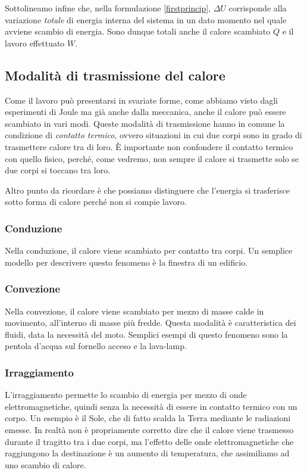 Sottolineamo infine che, nella formulazione \ref{firstprincip},
$\Delta U$ corrisponde alla variazione \textit{totale} di energia
interna del sistema in un dato momento nel quale avviene scambio
di energia. Sono dunque totali anche il calore scambiato
$Q$ e il lavoro effettuato $W$.


\subsection{Modalità di trasmissione del calore}
Come il lavoro può presentarsi in svariate forme, come abbiamo
visto dagli esperimenti di Joule ma già anche dalla meccanica,
anche il calore può essere scambiato in vari modi. Queste modalità
di trasmissione hanno in comune la condizione di \textit{contatto
termico}, ovvero situazioni in cui due corpi sono in grado di
trasmettere calore tra di loro. È importante non confondere il
contatto termico con quello fisico, perché, come vedremo, non
sempre il calore si trasmette solo se due corpi si toccano tra loro.

Altro punto da ricordare è che possiamo distinguere che l'energia
si trasferisce sotto forma di calore perché non si compie lavoro.

\subsubsection{Conduzione}
Nella conduzione, il calore viene scambiato per contatto tra corpi.
Un semplice modello per descrivere questo fenomeno è la finestra di
un edificio.

\subsubsection{Convezione}
Nella convezione, il calore viene scambiato per mezzo di masse calde
in movimento, all'interno di masse più fredde. Questa modalità è
caratteristica dei fluidi, data la necessità del moto. Semplici esempi
di questo fenomeno sono la pentola d'acqua sul fornello acceso e la
lava-lamp.

\subsubsection{Irraggiamento}
L'irraggiamento permette lo scambio di energia per mezzo di onde
elettromagnetiche, quindi senza la necessità di essere in contatto
termico con un corpo. Un esempio è il Sole, che di fatto scalda la
Terra mediante le radiazioni emesse. In realtà non è propriamente
corretto dire che il calore viene trasmesso durante il tragitto tra
i due corpi, ma l'effetto delle onde elettromagnetiche che raggiungono
la destinazione è un aumento di temperatura, che assimiliamo ad uno
scambio di calore.

